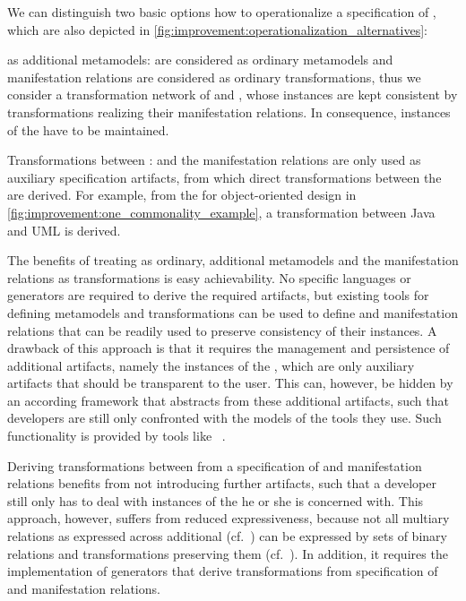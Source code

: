 We can distinguish two basic options how to operationalize a specification of \commonalities, which are also depicted in \autoref{fig:improvement:operationalization_alternatives}:
\begin{properdescription}
    \item[\Conceptmetamodels as additional metamodels:] \Conceptmetamodels are considered as ordinary metamodels and manifestation relations are considered as ordinary transformations, thus we consider a transformation network of \concretemetamodels and \conceptmetamodels, whose instances are kept consistent by transformations realizing their manifestation relations. In consequence, instances of the \conceptmetamodels have to be maintained.
    \item[Transformations between \concretemetamodels:] \Conceptmetamodels and the manifestation relations are only used as auxiliary specification artifacts, from which direct transformations between the \concretemetamodels are derived. For example, from the \conceptmetamodel for object-oriented design in \autoref{fig:improvement:one_commonality_example}, a transformation between Java and \gls{UML} is derived.
\end{properdescription}

The benefits of treating \conceptmetamodels as ordinary, additional metamodels and the manifestation relations as transformations is easy achievability.
No specific languages or generators are required to derive the required artifacts, but existing tools for defining metamodels and transformations can be used to define \conceptmetamodels and manifestation relations that can be readily used to preserve consistency of their instances.
A drawback of this approach is that it requires the management and persistence of additional artifacts, namely the instances of the \conceptmetamodels, which are only auxiliary artifacts that should be transparent to the user.
This can, however, be hidden by an according framework that abstracts from these additional artifacts, such that developers are still only confronted with the models of the tools they use.
Such functionality is provided by tools like \vitruv~\cite{klare2020Vitruv-JSS}.

Deriving transformations between \concretemetamodels from a specification of \conceptmetamodels and manifestation relations benefits from not introducing further artifacts, such that a developer still only has to deal with instances of the \concretemetamodels he or she is concerned with.
This approach, however, suffers from reduced expressiveness, because not all multiary relations as expressed across additional \conceptmetamodels (cf.~\cite{diskin2018MultiModelSynchronization-FASE}) can be expressed by sets of binary relations and transformations preserving them (cf.~\cite{stevens2020BidirectionalTransformationLarge-SoSym}).
In addition, it requires the implementation of generators that derive transformations from specification of \conceptmetamodels and manifestation relations.

